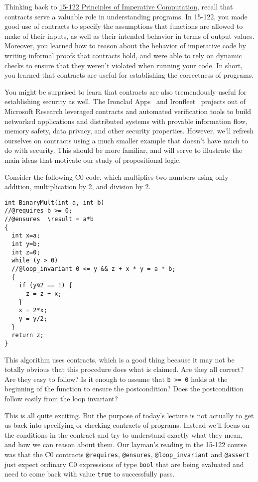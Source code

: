 \documentclass[11pt,twoside]{scrartcl}
\begin{document}
Thinking back to \href{http://www.cs.cmu.edu/~15122/}{15-122 Principles of Imperative Computation}, recall that contracts serve a valuable role in understanding programs. In 15-122, you made good use of contracts to specify the assumptions that functions are allowed to make of their inputs, as well as their intended behavior in terms of output values. Moreover, you learned how to reason about the behavior of imperative code by writing informal proofs that contracts hold, and were able to rely on dynamic checks to ensure that they weren't violated when running your code. In short, you learned that contracts are useful for establishing the correctness of programs.

You might be surprised to learn that contracts are also tremendously useful for establishing security as well. The Ironclad Apps~\cite{Hawblitzel2014} and Ironfleet~\cite{Hawblitzel2015} projects out of Microsoft Research leveraged contracts and automated verification tools to build networked applications and distributed systems with provable information flow, memory safety, data privacy, and other security properties. However, we'll refresh ourselves on contracts using a much smaller example that doesn't have much to do with security. This should be more familiar, and will serve to illustrate the main ideas that motivate our study of propositional logic.

Consider the following C0 code, which multiplies two numbers using only addition, multiplication by 2, and division by 2.

\begin{lstlisting}[basicstyle=\small,style=customjava]
int BinaryMult(int a, int b)
//@requires b >= 0;
//@ensures  \result = a*b
{
  int x=a;
  int y=b;
  int z=0;
  while (y > 0)
  //@loop_invariant 0 <= y && z + x * y = a * b;
  {
    if (y%2 == 1) {
      z = z + x;
    }
    x = 2*x;
    y = y/2;
  }
  return z;
}
\end{lstlisting}

This algorithm uses contracts, which is a good thing because it may not be totally obvious that this procedure does what is claimed.
Are they all correct?
Are they easy to follow?
Is it enough to assume that \verb'b >= 0' holds at the beginning of the function to ensure the postcondition?
Does the postcondition follow easily from the loop invariant?

This is all quite exciting.
But the purpose of today's lecture is not actually to get us back into specifying or checking contracts of programs. Instead we'll focus on the conditions in the contract and try to understand exactly what they mean, and how we can reason about them.
Our layman's reading in the 15-122 course was that  the C0 contracts \texttt{@requires}, \texttt{@ensures}, \texttt{@loop\_invariant} and \texttt{@assert} just expect ordinary C0 expressions of type \verb'bool' that are being evaluated and need to come back with value \verb'true' to successfully pass.
\end{document}
